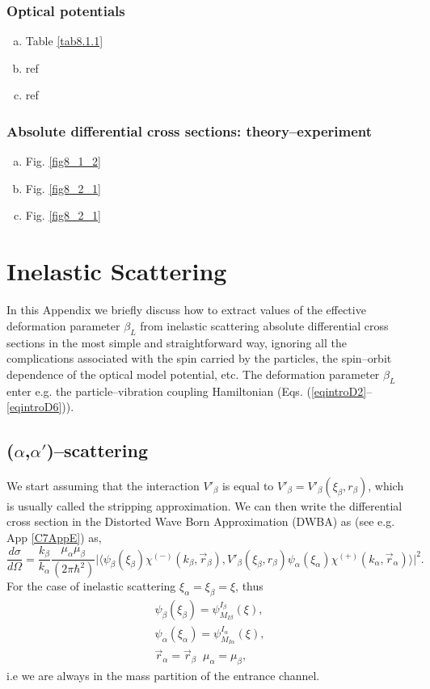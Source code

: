 \begin{subappendices}
\subsubsection{Optical potentials}
\begin{enumerate}[a)]
\item{Table \ref{tab8.1.1}}
\item{ref}
\item{ref}
\end{enumerate}
\subsubsection{Absolute differential cross sections: theory--experiment}
\begin{enumerate}[a)]
\item{Fig. \ref{fig8_1_2}}
\item{Fig. \ref{fig8_2_1}}
\item{Fig. \ref{fig8_2_1}}
\end{enumerate}
\section{Inelastic Scattering}\label{appintroE}
In this Appendix we briefly discuss   how to extract values of the effective deformation parameter $\beta_L$ from inelastic scattering absolute differential cross sections in the most simple and straightforward way, ignoring all the complications associated with the spin carried by the particles, the spin--orbit dependence of the optical model potential, etc. The deformation parameter $\beta_L$ enter e.g. the particle--vibration coupling Hamiltonian (Eqs. (\ref{eqintroD2}--\ref{eqintroD6})).
\subsection{($\alpha$,$\alpha'$)--scattering}
We start assuming that the interaction $V'_\beta$ is equal to $V'_\beta=V'_\beta(\xi_\beta,r_\beta)$, which is usually called the stripping approximation.
We can then write the differential cross section in the Distorted Wave Born Approximation (DWBA) as (see e.g. App \ref{C7AppE}) as,
\begin{equation}\label{eq4l1}
 \frac{d\sigma}{d\Omega}=\frac{k_\beta}{k_\alpha}\frac{\mu_\alpha \mu_\beta}{(2 \pi \hbar^2)}\vert\langle
\psi_\beta(\xi_\beta)\chi^{(-)}(k_\beta,\vec{r}_\beta),V'_\beta(\xi_\beta,r_\beta) \psi_\alpha(\xi_\alpha)\chi^{(+)}(k_\alpha,\vec{r}_\alpha)\rangle\vert^2.
\end{equation}
For the case of inelastic scattering $\xi_\alpha=\xi_\beta=\xi$, thus
\begin{subequations}
\begin{align}\label{eq4l2}
\psi_\beta(\xi_\beta)=\psi_{M_{I\beta}}^{I_\beta}(\xi),\\
\psi_\alpha(\xi_\alpha)=\psi_{M_{I\alpha}}^{I_\alpha}(\xi),\\
\vec{r}_\alpha=\vec{r}_\beta\;\;\mu_\alpha =\mu_\beta,
\end{align}
\end{subequations}
i.e we are always in the mass partition of the entrance channel.


\end{subappendices}
